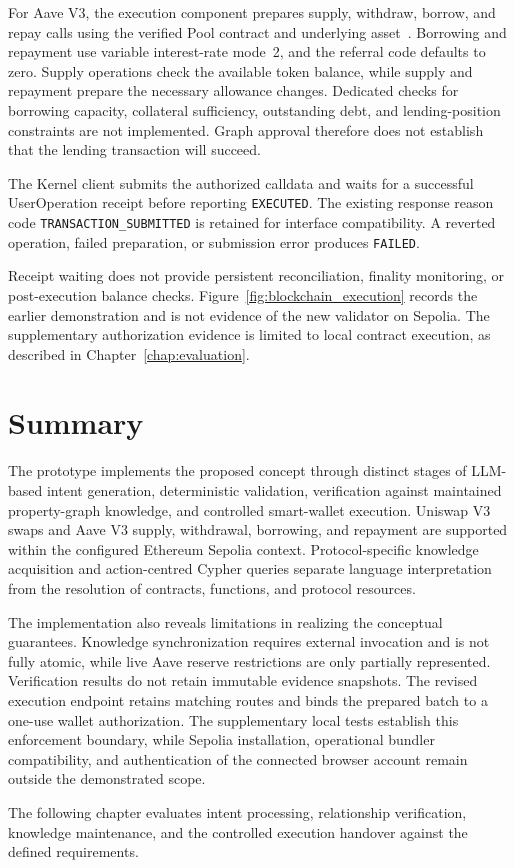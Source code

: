For Aave V3, the execution component prepares supply,
withdraw, borrow, and repay calls using the verified
Pool contract and underlying asset~\cite{implAavePool}.
Borrowing and repayment use variable interest-rate
mode~2, and the referral code defaults to zero.
Supply operations check the available token balance,
while supply and repayment prepare the necessary
allowance changes. Dedicated checks for borrowing
capacity, collateral sufficiency, outstanding debt,
and lending-position constraints are not implemented.
Graph approval therefore does not establish that
the lending transaction will succeed.

The Kernel client submits the authorized calldata and waits for a
successful UserOperation receipt before reporting \texttt{EXECUTED}.
The existing response reason code \texttt{TRANSACTION\_SUBMITTED} is
retained for interface compatibility. A reverted operation, failed
preparation, or submission error produces \texttt{FAILED}.



Receipt waiting does not provide persistent reconciliation, finality
monitoring, or post-execution balance checks. Figure~\ref{fig:blockchain_execution}
records the earlier demonstration and is not evidence of the new validator
on Sepolia. The supplementary authorization evidence is limited to local
contract execution, as described in Chapter~\ref{chap:evaluation}.



\section{Summary}
\label{sec:implementation_summary}

The prototype implements the proposed concept through distinct
stages of LLM-based intent generation, deterministic validation,
verification against maintained property-graph knowledge, and
controlled smart-wallet execution. Uniswap V3 swaps and Aave V3
supply, withdrawal, borrowing, and repayment are supported within
the configured Ethereum Sepolia context. Protocol-specific
knowledge acquisition and action-centred Cypher queries separate
language interpretation from the resolution of contracts, functions,
and protocol resources.

The implementation also reveals limitations in realizing the
conceptual guarantees. Knowledge synchronization requires external
invocation and is not fully atomic, while live Aave reserve
restrictions are only partially represented. Verification results
do not retain immutable evidence snapshots. The revised execution
endpoint retains matching routes and binds the prepared batch to a
one-use wallet authorization. The supplementary local tests establish
this enforcement boundary, while Sepolia installation, operational
bundler compatibility, and authentication of the connected browser
account remain outside the demonstrated scope.

The following chapter evaluates intent processing, relationship
verification, knowledge maintenance, and the controlled execution
handover against the defined requirements.

